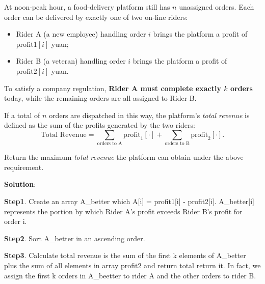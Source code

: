 \problem{}

At noon-peak hour, a food-delivery platform still has $n$ unassigned orders.  
Each order can be delivered by exactly one of two on-line riders:

\begin{itemize}
\item Rider A (a new employee) handling order $i$ brings the platform a profit of $\text{profit1}[i]$ yuan;
\item Rider B (a veteran) handling order $i$ brings the platform a profit of $\text{profit2}[i]$ yuan.
\end{itemize}

To satisfy a company regulation, \textbf{Rider A must complete exactly $k$ orders} today, while the remaining orders are all assigned to Rider B.

If a total of $n$ orders are dispatched in this way, the platform's \emph{total revenue} is defined as the sum of the profits generated by the two riders:
\[
\text{Total Revenue} = \sum_{\text{orders to A}} \text{profit}_1[\cdot] + \sum_{\text{orders to B}} \text{profit}_2[\cdot].
\]

Return the maximum \emph{total revenue} the platform can obtain under the above requirement.

\noindent \textbf{Solution}:

\noindent \textbf{Step1}.
Create an array A\_better which A[i] = profit1[i] - profit2[i]. A\_better[i] represents the portion by which Rider A's profit exceeds Rider B's profit for order i.

\noindent \textbf{Step2}.
Sort A\_better in an ascending order.

\noindent \textbf{Step3}.
Calculate total revenue is the sum of the first k elements of A\_better plus the sum of all elements in array profit2 and return total return it. In fact, we assign the first k orders in A\_beetter to  rider A and the other orders to rider B.

\newpage